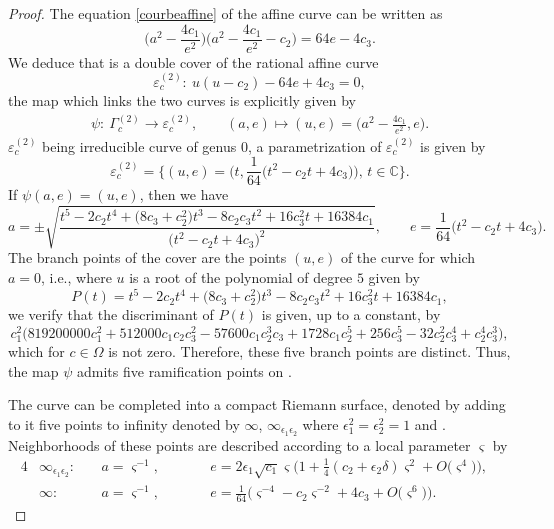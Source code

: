 \documentclass[10pt,a4paper]{amsart}
\numberwithin{equation}{section}
\begin{document}
\begin{proof}
The equation \eqref{courbeaffine} of the affine curve
 can be written as
\[\biggl(a^2-\frac{4c_1}{e^2}\biggr)\biggl(a^2-\frac{4c_1}{e^2}-c_2\biggr)=64e-4c_3.\]
 We deduce that  is a double cover of the rational affine curve
 \[\varepsilon_c^{(2)}\colon \ u(u-c_2)-64e+4c_3=0,\]
the map which links the two curves is explicitly given by
\begin{align*}
 \psi\colon \ \Gamma_c^{(2)} \longrightarrow \varepsilon_c^{(2)}, \qquad
 (a,e) \longmapsto (u,e)=\biggl(a^2-\frac{4c_1}{e^2},e\biggr).
\end{align*}
$\varepsilon_c^{(2)}$ being irreducible curve of genus
$0$, a parametrization of $\varepsilon_c^{(2)}$ is given
by \[ \varepsilon_c^{(2)}=\biggl\{
(u,e)=\biggl(t,\frac{1}{64}\bigl(t^2-c_2t+4c_3\bigr)\biggr),\, t
\in \mathbb{C}\biggr\}. \]
 If $\psi(a,e)=(u,e)$, then we have
 \begin{equation*}
 a=\pm\sqrt{\frac{t^5-2c_2t^4+\bigl(8c_3+c_2^2\bigr)t^3-8c_2c_3t^2+16c_3^2t+16384c_1}{\bigl(t^2 -c_2t+4c_3\bigr)^2}},
\qquad e=\frac{1}{64}\bigl(t^2-c_2t+4c_3\bigr).
\end{equation*}
The branch points of the cover  are the points
$(u,e)$ of the curve  for
which $a =0$, i.e., where $u$ is a root of the polynomial of degree
$5$ given by
 \[P(t)=t^5-2c_2t^4+\bigl(8c_3+c_2^2\bigr)t^3-8c_2c_3t^2+16c_3^2t+16384c_1,\]
 we verify that the discriminant of $P(t)$ is given, up to a constant, by
\[c_1^2\bigl(819200000c_1^2+512000c_1c_2c_3^2-57600c_1c_2^3c_3+1728c_1c_2^5+256c_3^5-32c_2^2c_3^4+c_2^4c_3^3\bigr),\]
which for $c \in \Omega$ is not zero. Therefore, these five branch points are distinct. Thus, the map $\psi$ admits five ramification points on .

The curve  can be completed into a compact Riemann surface, denoted  by adding to it
 five points to infinity denoted by $\infty$, $\infty_{\epsilon_1\epsilon_2}$
 where $\epsilon_1^2=\epsilon_2^2=1$ and . Neighborhoods of these points are described according to a local parameter $\varsigma$ by
\begin{alignat}{4}
&\infty_{\epsilon_1\epsilon_2}\colon \ && a =\varsigma^{-1}, \qquad &&
e =2\epsilon_1\sqrt{c_1}\varsigma\biggl(1+\frac{1}{4}(c_2+\epsilon_2\delta)\varsigma^2+O\bigl(\varsigma^4\bigr)\biggr), &\label{valeurde_inftyvarepsilonm2}\\
&\infty\colon \ && a =\varsigma^{-1}, \qquad &&
e=\frac{1}{64}\bigl(\varsigma^{-4}-c_2\varsigma^{-2}+4c_3+O\bigl(\varsigma^6\bigr)\bigr).&\label{valeurde_inftym2}
\end{alignat}


\end{proof}
\end{document}
